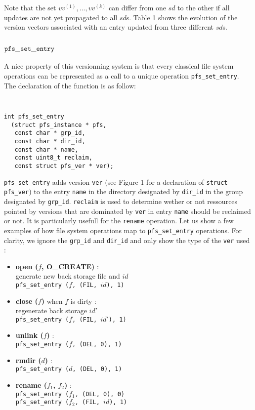 \documentclass[letterpaper,twocolumn,10pt]{article}
\begin{document}
Note that the set $vv^{(1)},..., vv^{(k)}$ can differ from one $sd$ to
the other if all updates are not yet propagated to all $sd$s. Table 1
shows the evolution of the version vectors associated with an
entry updated from three different $sd$s.

\subsection {${\tt pfs\_set\_entry}$}

A nice property of this versionning system is that every classical
file system operations can be represented as a call to a unique
operation {\tt pfs\_set\_entry}. The declaration of the function is as
follow:

\begin{center}
{\tt \small
\begin{verbatim}
int pfs_set_entry 
  (struct pfs_instance * pfs,
   const char * grp_id,
   const char * dir_id,
   const char * name,
   const uint8_t reclaim,
   const struct pfs_ver * ver);
\end{verbatim}
}
\end{center}

{\tt pfs\_set\_entry} adds version {\tt ver} (see Figure 1 for a declaration
of {\tt struct pfs\_ver}) to the entry {\tt name} in the directory
designated by {\tt dir\_id} in the group designated by {\tt grp\_id}.
{\tt reclaim} is used to determine wether or not ressources pointed by
versions that are dominated by {\tt ver} in entry {\tt name} should be
reclaimed or not. It is particularly usefull for the {\tt rename}
operation. Let us show a few examples of how file system operations
map to {\tt pfs\_set\_entry} operations. For clarity, we ignore the
{\tt grp\_id} and {\tt dir\_id} and only show the type of the 
{\tt ver} used :

\begin{itemize}
  \item \textbf{open ($f$, O\_CREATE)} : \\
    generate new back storage file and $id$ \\
    {\tt pfs\_set\_entry ($f$, (FIL, $id$), 1)}

  \item \textbf{close ($f$)} when $f$ is dirty : \\
    regenerate back storage $id'$ \\
    {\tt pfs\_set\_entry ($f$, (FIL, $id'$), 1)}
    
  \item \textbf{unlink ($f$)} : \\
    {\tt pfs\_set\_entry ($f$, (DEL, 0), 1)}

  \item \textbf{rmdir ($d$)} : \\
    {\tt pfs\_set\_entry ($d$, (DEL, 0), 1)}

  \item \textbf{rename ($f_1$, $f_2$)} : \\
    {\tt pfs\_set\_entry ($f_1$, (DEL, 0), 0)} \\
    {\tt pfs\_set\_entry ($f_2$, (FIL, $id$), 1)}
\end{itemize}
\end{document}
